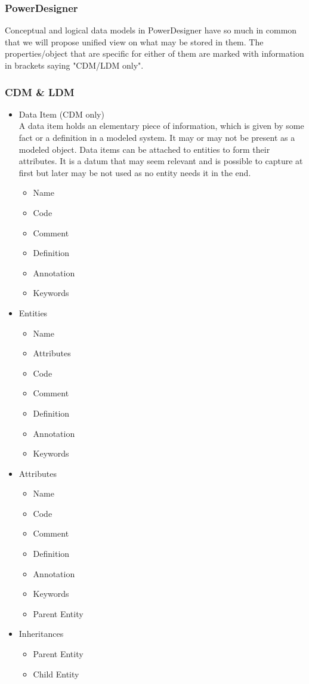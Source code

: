 \subsubsection{PowerDesigner}

Conceptual and logical data models in PowerDesigner have so much in common that we will propose unified view on what may be stored in them. The properties/object that are specific for either of them are marked with information in brackets saying "CDM/LDM only".

\subsubsection{CDM \& LDM}

\begin{itemize}
	\item Data Item (CDM only) \\
	A data item holds an elementary piece of information, which is given by some fact or a definition in a modeled system. It may or may not be present as a modeled object. Data items can be attached to entities to form their attributes. It is a datum that may seem relevant and is possible to capture at first but later may be not used as no entity needs it in the end.
	\begin{itemize}
		\item Name
		\item Code 
		\item Comment
		\item Definition
		\item Annotation
		\item Keywords
	\end{itemize}
	\item Entities
	\begin{itemize}
		\item Name 
		\item Attributes
		\item Code 
		\item Comment
		\item Definition
		\item Annotation
		\item Keywords
	\end{itemize}
	\item Attributes
	\begin{itemize}
		\item Name 
		\item Code 
		\item Comment
		\item Definition
		\item Annotation
		\item Keywords
		\item Parent Entity
	\end{itemize}
	\item Inheritances
	\begin{itemize}
		\item Parent Entity
		\item Child Entity
	\end{itemize}
\end{itemize}

